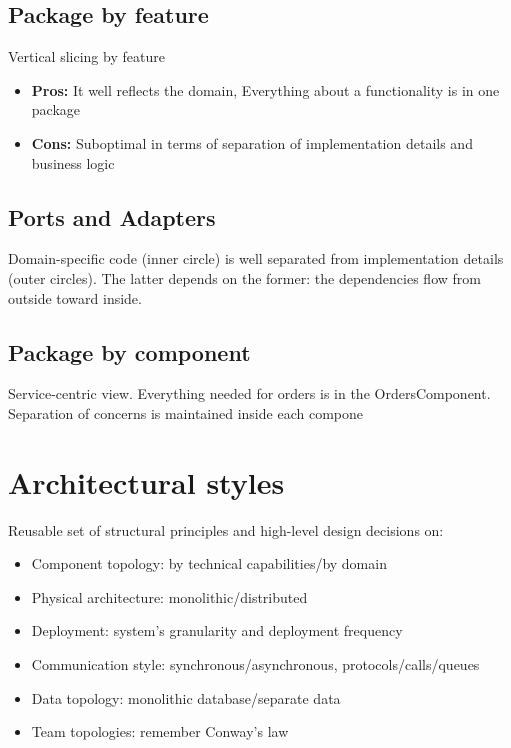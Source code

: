 \subsection{Package by feature}

Vertical slicing by feature


\begin{itemize}
  \item \textbf{Pros:} It well reflects the domain, Everything about a functionality is
        in one package
  \item \textbf{Cons:} Suboptimal in terms of separation
        of implementation details and
        business logic
\end{itemize}


\subsection{Ports and Adapters}

Domain-specific code (inner circle)
is well separated from
implementation details (outer
circles). The latter depends on the former:
the dependencies flow from
outside toward inside.


\subsection{Package by component}
Service-centric view.
Everything needed for orders is in
the OrdersComponent. Separation of concerns is
maintained inside each compone


\section{Architectural styles}
Reusable set of structural principles and high-level design decisions on:

\begin{itemize}
  \item Component topology: by technical capabilities/by domain
  \item Physical architecture: monolithic/distributed
  \item Deployment: system's granularity and deployment frequency
  \item Communication style: synchronous/asynchronous, protocols/calls/queues
  \item Data topology: monolithic database/separate data
  \item Team topologies: remember Conway's law
\end{itemize}


